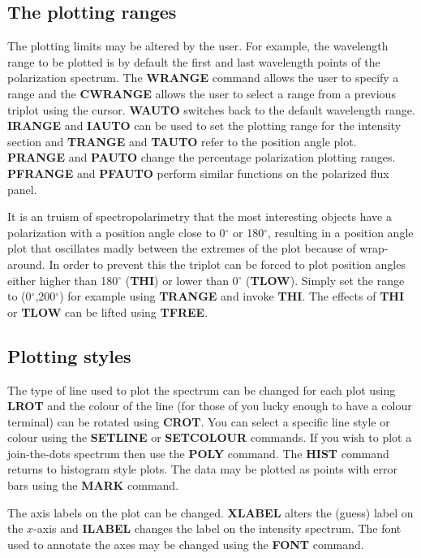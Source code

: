 \documentclass[11pt,nolof,noabs]{starlink}
\begin{document}
\subsection{The plotting ranges}

The plotting limits may be altered by the user. For example, the
wavelength range to be plotted is by default the first and last
wavelength points of the polarization spectrum. The \textbf{WRANGE}
command allows the user to specify a range and the \textbf{CWRANGE}
allows the user to select a range from a previous triplot using the
cursor. \textbf{WAUTO} switches back to the default wavelength range.
\textbf{IRANGE} and \textbf{IAUTO} can be used to set the plotting range for
the intensity section and \textbf{TRANGE} and \textbf{TAUTO} refer to the
position angle plot. \textbf{PRANGE} and \textbf{PAUTO} change the
percentage polarization plotting ranges. \textbf{PFRANGE} and \textbf{PFAUTO} perform similar functions on the polarized flux panel.

It is an truism of spectropolarimetry that the most interesting objects
have a polarization with a position angle close to 0$^\circ$ or
180$^\circ$, resulting in a position angle plot that oscillates madly
between the extremes of the plot because of wrap-around. In order to
prevent this the triplot can be forced to plot position angles either
higher than 180$^\circ$ (\textbf{THI}) or lower than 0$^\circ$ (\textbf{TLOW}). Simply set the range to (0$^\circ$,200$^\circ$) for
example using \textbf{TRANGE} and invoke \textbf{THI}. The effects of \textbf{THI} or \textbf{TLOW} can be lifted using \textbf{TFREE}.

\subsection{Plotting styles}

The type of line used to plot the spectrum can be changed for each
plot using \textbf{LROT} and the colour of the line (for those of you
lucky enough to have a colour terminal) can be rotated using \textbf{CROT}. You can select a specific line style or colour using the \textbf{SETLINE} or \textbf{SETCOLOUR} commands. If you wish to plot a
join-the-dots spectrum then use the \textbf{POLY} command. The \textbf{HIST} command returns to histogram style plots. The data may be
plotted as points with error bars using the \textbf{MARK} command.

The axis labels on the plot can be changed. \textbf{XLABEL} alters the
(guess) label on the $x$-axis and \textbf{ILABEL} changes the label on
the intensity spectrum. The font used to annotate the axes may be
changed using the \textbf{FONT} command.
\end{document}
